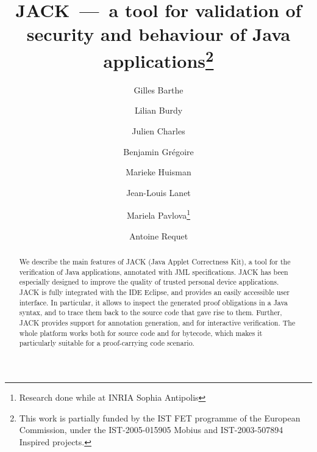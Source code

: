 \documentclass{llncs}
\title{JACK~---~a tool for validation of security and behaviour of Java
applications\thanks{This work is partially funded by the IST FET
programme of the European Commission, under the IST-2005-015905
\textsf{Mobius} and IST-2003-507894 \textsf{Inspired} projects.}}
\author{Gilles Barthe\inst{1} \and
        Lilian Burdy\and %
        Julien Charles\inst{1} \and
        Benjamin Gr\'egoire\inst{1} \and
        Marieke Huisman\inst{1} \and
        Jean-Louis Lanet\inst{2} \and
        Mariela Pavlova\inst{3}\thanks{Research done while at INRIA Sophia Antipolis} \and
        Antoine Requet\inst{2}}
\institute{INRIA Sophia Antipolis, France \and 
           gemalto, France \and 
           Ludwig-Maximilians-Universit\"at M\"unchen, Germany}
\begin{document}
\maketitle      
\begin{abstract}
We describe the main features of JACK (Java Applet Correctness Kit), a
tool for the verification of Java applications, annotated with JML
specifications. JACK has been especially designed to improve the
quality of trusted personal device applications. JACK is fully
integrated with the IDE Eclipse, and provides an easily accessible
user interface. In particular, it allows to inspect the generated
proof obligations in a Java syntax, and to trace them back to the
source code that gave rise to them. Further, JACK provides support for
annotation generation, and for interactive verification. The whole
platform works both for source code and for bytecode, which makes it
particularly suitable for a proof-carrying code scenario.
\end{abstract}
        










\end{document}
